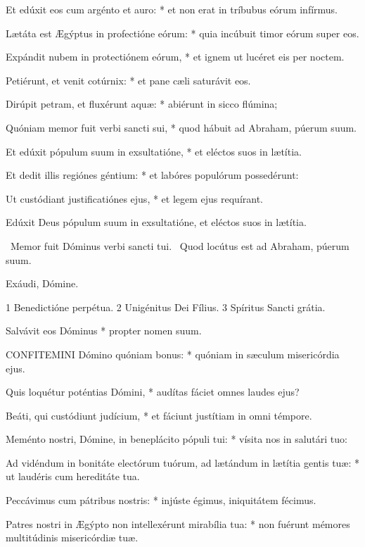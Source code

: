 Et edúxit eos cum argénto et auro: * et non erat in tríbubus eórum infírmus.

Lætáta est Ægýptus in profectióne eórum: * quia incúbuit timor eórum super eos.

Expándit nubem in protectiónem eórum, * et ignem ut lucéret eis per noctem.

Petiérunt, et venit cotúrnix: * et pane cæli saturávit eos.

Dirúpit petram, et fluxérunt aquæ: * abiérunt in sicco flúmina;

Quóniam memor fuit verbi sancti sui, * quod hábuit ad Abraham, púerum suum.

Et edúxit pópulum suum in exsultatióne, * et eléctos suos in lætítia.

Et dedit illis regiónes géntium: * et labóres populórum possedérunt:

Ut custódiant justificatiónes ejus, * et legem ejus requírant.

 Edúxit Deus pópulum suum in exsultatióne, et eléctos suos in lætítia.


\V\ Memor fuit Dóminus verbi sancti tui. \R\ Quod locútus est ad Abraham, púerum suum.

 Exáudi, Dómine.

 1 Benedictióne perpétua. 2 Unigénitus Dei Fílius. 3 Spíritus Sancti grátia.


 Salvávit eos Dóminus * propter nomen suum.


\lettrine[lines=2]{C}{ONFITEMINI} Dómino quóniam bonus: * quóniam in sæculum misericórdia ejus.

Quis loquétur poténtias Dómini, * audítas fáciet omnes laudes ejus?

Beáti, qui custódiunt judícium, * et fáciunt justítiam in omni témpore.

Meménto nostri, Dómine, in beneplácito pópuli tui: * vísita nos in salutári tuo:

Ad vidéndum in bonitáte electórum tuórum, ad lætándum in lætítia gentis tuæ: * ut laudéris cum hereditáte tua.

Peccávimus cum pátribus nostris: * injúste égimus, iniquitátem fécimus.

Patres nostri in Ægýpto non intellexérunt mirabília tua: * non fuérunt mémores multitúdinis misericórdiæ tuæ.

